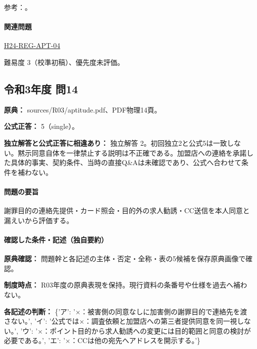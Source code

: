 \par 参考：\cite{privacy_general,privacy_evacuation2013,privacy_evacuation_scope}。

\paragraph{関連問題} \hyperref[q:h24-reg-apt-04]{H24-REG-APT-04}

\par 難易度 3（校準初稿）、優先度未評価。

\subsection{令和3年度 問14}
\label{q:r03-reg-apt-14}

\noindent\textbf{原典：} sources/R03/aptitude.pdf、PDF物理14頁。

\textbf{公式正答：} 5（single）。

\par\textbf{独立解答と公式正答に相違あり：} 独立解答 2。初回独立2と公式5は一致しない。黙示同意自体を一律禁止する説明は不正確である。加盟店への連絡を承諾した具体的事実、契約条件、当時の直接Q\&Aは未確認であり、公式へ合わせて条件を補わない。

\paragraph{問題の要旨} 謝罪目的の連絡先提供・カード照会・目的外の求人勧誘・CC送信を本人同意と漏えいから評価する。

\paragraph{確認した条件・記述（独自要約）}\mbox{}\par

\noindent\textbf{原典確認：} 問題幹と各記述の主体・否定・全称・表の5候補を保存原典画像で確認。\par

\noindent\textbf{制度時点：} R03年度の原典表現を保持。現行資料の条番号や仕様を過去へ補わない。\par

\noindent\textbf{各記述の判断：} \{'ア': '×：被害側の同意なしに加害側の謝罪目的で連絡先を渡さない。', 'イ': '公式では×：調査依頼と加盟店への第三者提供同意を同一視しない。', 'ウ': '×：ポイント目的から求人勧誘への変更には目的範囲と同意の検討が必要である。', 'エ': '×：CCは他の宛先へアドレスを開示する。'\}\par

